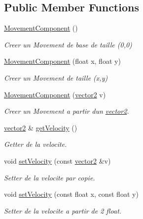 \subsection*{Public Member Functions}
\begin{DoxyCompactItemize}
\item 
\hypertarget{class_movement_component_a8c22ac85ae143a750b109a0afcd5832f}{}\label{class_movement_component_a8c22ac85ae143a750b109a0afcd5832f} 
\hyperlink{class_movement_component_a8c22ac85ae143a750b109a0afcd5832f}{Movement\+Component} ()
\begin{DoxyCompactList}\small\item\em Creer un Movement de base de taille (0,0) \end{DoxyCompactList}\item 
\hyperlink{class_movement_component_a2fa2f87c3e4cdc69489e5ce06a131fd1}{Movement\+Component} (float x, float y)
\begin{DoxyCompactList}\small\item\em Creer un Movement de taille (x,y) \end{DoxyCompactList}\item 
\hyperlink{class_movement_component_ac9432753c0b29b1206e04c139e56c757}{Movement\+Component} (\hyperlink{structvector2}{vector2} v)
\begin{DoxyCompactList}\small\item\em Creer un Movement a partir d\textquotesingle{}un \hyperlink{structvector2}{vector2}. \end{DoxyCompactList}\item 
\hyperlink{structvector2}{vector2} \& \hyperlink{class_movement_component_a1b3cc0445b34ceafb79d694ecafbcd2c}{get\+Velocity} ()
\begin{DoxyCompactList}\small\item\em Getter de la velocite. \end{DoxyCompactList}\item 
void \hyperlink{class_movement_component_a713784d4a7ccca4e4ad946f73d2db6cd}{set\+Velocity} (const \hyperlink{structvector2}{vector2} \&v)
\begin{DoxyCompactList}\small\item\em Setter de la velocite par copie. \end{DoxyCompactList}\item 
void \hyperlink{class_movement_component_add7629692ed68862ff1fd1f3515e2ea6}{set\+Velocity} (const float x, const float y)
\begin{DoxyCompactList}\small\item\em Setter de la velocite a partir de 2 float. \end{DoxyCompactList}\end{DoxyCompactItemize}


